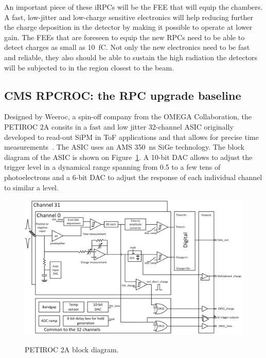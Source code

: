 	An important piece of these iRPCs will be the \acl{FEE} that will equip the chambers. A fast, low-jitter and low-charge sensitive electronics will help reducing further the charge deposition in the detector by making it possible to operate at lower gain. The FEEs that are foreseen to equip the new RPCs need to be able to detect charges as small as \SI{10}{fC}. Not only the new electronics need to be fast and reliable, they also should be able to sustain the high radiation the detectors will be subjected to in the region closest to the beam.
	
	\subsection{CMS RPCROC: the RPC upgrade baseline}
	\label{chapt6:ssec:RPCROC}
	
	Designed by Weeroc, a spin-off company from the OMEGA Collaboration, the PETIROC 2A consits in a fast and low jitter 32-channel ASIC originally developed to read-out \acf{SiPM} in ToF applications and that allows for precise time measurements~\cite{PETIROCIEEE,PETIROCTWEPP}. The ASIC uses an AMS \SI{350}{ns} \acf{SiGe} technology. The block diagram of the ASIC is shown on Figure~\ref{fig:PETIROCASIC}. A 10-bit DAC allows to adjust the trigger level in a dynamical range spanning from 0.5 to a few tens of photoelectrons and a 6-bit DAC to adjust the response of each individual channel to similar a level.
	
	\begin{figure}[H]
		\centering
		\includegraphics[width = \linewidth]{fig/chapt6/petiroc2.png}\\
		\caption{\label{fig:PETIROCASIC} PETIROC 2A block diagram.}
	\end{figure}
	
